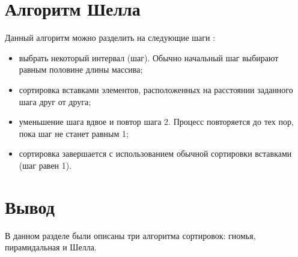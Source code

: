 \section{Алгоритм Шелла}


Данный алгоритм можно разделить на следующие шаги \cite{shell}:

\begin{itemize}
	\item выбрать некоторый интервал (шаг). Обычно начальный шаг выбирают равным половине длины массива;
	\item сортировка вставками элементов, расположенных на расстоянии заданного шага друг от друга;
	\item уменьшение шага вдвое и повтор шага 2. Процесс повторяется до тех пор, пока шаг не станет равным 1;
	\item сортировка завершается с использованием обычной сортировки вставками (шаг равен 1).
\end{itemize}


\section*{Вывод}

В данном разделе были описаны три алгоритма сортировок: гномья, пирамидальная и Шелла.
